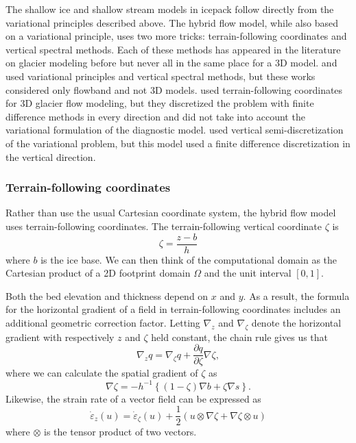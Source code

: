 \documentclass{article}
\theoremstyle{definition}
\theoremstyle{plain}
\begin{document}
The shallow ice and shallow stream models in icepack follow directly from the variational principles described above.
The hybrid flow model, while also based on a variational principle, uses two more tricks: terrain-following coordinates and vertical spectral methods.
Each of these methods has appeared in the literature on glacier modeling before but never all in the same place for a 3D model.
\citet{langdon1978numerical} and \cite{bassis2010hamilton} used variational principles and vertical spectral methods, but these works considered only flowband and not 3D models.
\citet{kleiner2014numerical} used terrain-following coordinates for 3D glacier flow modeling, but they discretized the problem with finite difference methods in every direction and did not take into account the variational formulation of the diagnostic model.
\citet{jouvet2015multilayer} used vertical semi-discretization of the variational problem, but this model used a finite difference discretization in the vertical direction.

\subsubsection{Terrain-following coordinates}

Rather than use the usual Cartesian coordinate system, the hybrid flow model uses terrain-following coordinates.
The terrain-following vertical coordinate $\zeta$ is
\begin{equation}
    \zeta = \frac{z - b}{h}
\end{equation}
where $b$ is the ice base.
We can then think of the computational domain as the Cartesian product of a 2D footprint domain $\Omega$ and the unit interval $[0, 1]$.

Both the bed elevation and thickness depend on $x$ and $y$.
As a result, the formula for the horizontal gradient of a field in terrain-following coordinates includes an additional geometric correction factor.
Letting $\nabla_z$ and $\nabla_\zeta$ denote the horizontal gradient with respectively $z$ and $\zeta$ held constant, the chain rule gives us that
\begin{equation}
    \nabla_zq = \nabla_\zeta q + \frac{\partial q}{\partial\zeta}\nabla\zeta,
\end{equation}
where we can calculate the spatial gradient of $\zeta$ as
\begin{equation}
    \nabla\zeta = -h^{-1}\left\{(1 - \zeta)\nabla b + \zeta\nabla s\right\}.
\end{equation}
Likewise, the strain rate of a vector field can be expressed as
\begin{equation}
    \dot\varepsilon_z(u) = \dot\varepsilon_\zeta(u) + \frac{1}{2}\left(u \otimes\nabla\zeta + \nabla\zeta\otimes u\right)
    \label{eq:geometric-correction}
\end{equation}
where $\otimes$ is the tensor product of two vectors.
\end{document}
